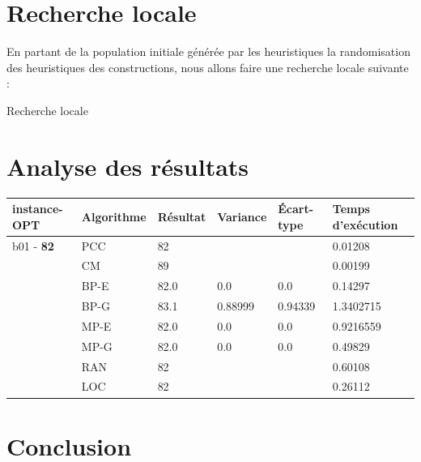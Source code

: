 \documentclass[12pt,a4paper]{article}
\begin{document}
\section{Recherche locale}
En partant de la population initiale générée par les heuristiques la randomisation des heuristiques des constructions, nous allons faire une recherche locale suivante :\\
\begin{algorithm}[H]
	\caption{Recherche locale}
\end{algorithm}

\section{Analyse des résultats}

\begin{center}
	\begin{tabular}{l|l|l|l|l|l}
		instance-OPT & Algorithme & Résultat & Variance & Écart-type & Temps d'exécution\\ \hline \hline
		b01 - \textbf{82}&PCC&82&&&0.01208\\
		&CM&89&&&0.00199\\
		&BP-E&82.0&0.0&0.0&0.14297\\
		&BP-G&83.1&0.88999&0.94339&1.3402715\\
		&MP-E&82.0&0.0&0.0&0.9216559\\
		&MP-G&82.0&0.0&0.0&0.49829\\
		&RAN&82&&&0.60108\\
		&LOC&82&&&0.26112\\
		 \hline
	\end{tabular}
\end{center}

\section{Conclusion}
\end{document}
